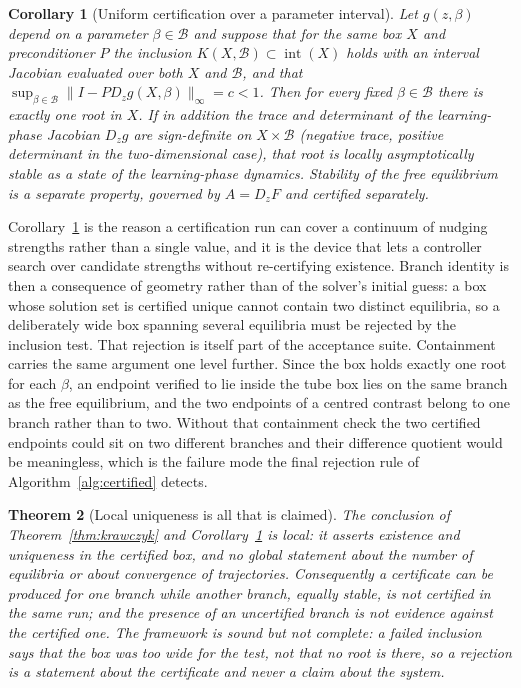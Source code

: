 \documentclass[11pt]{article}
\newtheorem{theorem}{Theorem}
\newtheorem{corollary}[theorem]{Corollary}
\theoremstyle{definition}
\theoremstyle{remark}
\newcommand{\norm}[1]{\lVert #1 \rVert}
\begin{document}
\begin{corollary}[Uniform certification over a parameter interval]
\label{cor:tube}
Let $g(z,\beta)$ depend on a parameter $\beta \in \mathcal{B}$ and suppose that for the same
box $X$ and preconditioner $P$ the inclusion $K(X,\mathcal{B}) \subset \operatorname{int}(X)$
holds with an interval Jacobian evaluated over both $X$ and $\mathcal{B}$, and that
$\sup_{\beta \in \mathcal{B}}\norm{I - P D_z g(X,\beta)}_{\infty} = c < 1$. Then for every fixed
$\beta \in \mathcal{B}$ there is exactly one root in $X$. If in addition the trace and determinant
of the learning-phase Jacobian $D_z g$ are sign-definite on $X \times \mathcal{B}$ (negative trace,
positive determinant in the two-dimensional case), that root is locally asymptotically stable as a
state of the learning-phase dynamics. Stability of the free equilibrium is a separate property,
governed by $A = D_z F$ and certified separately.
\end{corollary}

Corollary~\ref{cor:tube} is the reason a certification run can cover a continuum of nudging
strengths rather than a single value, and it is the device that lets a controller search over
candidate strengths without re-certifying existence. Branch identity is then a consequence of
geometry rather than of the solver's initial guess: a box whose solution set is certified unique
cannot contain two distinct equilibria, so a deliberately wide box spanning several equilibria
must be rejected by the inclusion test. That rejection is itself part of the acceptance suite.
Containment carries the same argument one level further. Since the box holds exactly one root for
each $\beta$, an endpoint verified to lie inside the tube box lies on the same branch as the free
equilibrium, and the two endpoints of a centred contrast belong to one branch rather than to two.
Without that containment check the two certified endpoints could sit on two different branches and
their difference quotient would be meaningless, which is the failure mode the final rejection rule
of Algorithm~\ref{alg:certified} detects.

\begin{theorem}[Local uniqueness is all that is claimed]\label{thm:local}
The conclusion of Theorem~\ref{thm:krawczyk} and Corollary~\ref{cor:tube} is local: it asserts
existence and uniqueness in the certified box, and no global statement about the number of
equilibria or about convergence of trajectories. Consequently a certificate can be produced for
one branch while another branch, equally stable, is not certified in the same run; and the
presence of an uncertified branch is not evidence against the certified one. The framework is
sound but not complete: a failed inclusion says that the box was too wide for the test, not that
no root is there, so a rejection is a statement about the certificate and never a claim about the
system.
\end{theorem}
\end{document}
